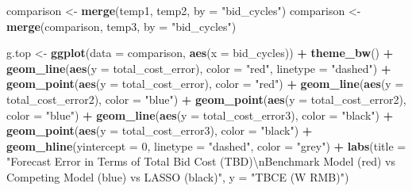 \documentclass[]{article}
\newenvironment{Shaded}{\begin{snugshade}}{\end{snugshade}}
\newcommand{\KeywordTok}[1]{\textcolor[rgb]{0.13,0.29,0.53}{\textbf{#1}}}
\newcommand{\DataTypeTok}[1]{\textcolor[rgb]{0.13,0.29,0.53}{#1}}
\newcommand{\DecValTok}[1]{\textcolor[rgb]{0.00,0.00,0.81}{#1}}
\newcommand{\CharTok}[1]{\textcolor[rgb]{0.31,0.60,0.02}{#1}}
\newcommand{\StringTok}[1]{\textcolor[rgb]{0.31,0.60,0.02}{#1}}
\newcommand{\OperatorTok}[1]{\textcolor[rgb]{0.81,0.36,0.00}{\textbf{#1}}}
\newcommand{\NormalTok}[1]{#1}
\begin{document}
\begin{Shaded}
\begin{Highlighting}[]
{\NormalTok{comparison <-}\StringTok{ }\KeywordTok{merge}\NormalTok{(temp1, temp2, }\DataTypeTok{by =} \StringTok{"bid_cycles"}\NormalTok{)}
\NormalTok{comparison <-}\StringTok{ }\KeywordTok{merge}\NormalTok{(comparison, temp3, }\DataTypeTok{by =} \StringTok{"bid_cycles"}\NormalTok{)}

\NormalTok{g.top <-}\StringTok{ }\KeywordTok{ggplot}\NormalTok{(}\DataTypeTok{data =}\NormalTok{ comparison, }\KeywordTok{aes}\NormalTok{(}\DataTypeTok{x =}\NormalTok{ bid_cycles)) }\OperatorTok{+}
\StringTok{  }\KeywordTok{theme_bw}\NormalTok{() }\OperatorTok{+}
\StringTok{  }\KeywordTok{geom_line}\NormalTok{(}\KeywordTok{aes}\NormalTok{(}\DataTypeTok{y =}\NormalTok{ total_cost_error), }\DataTypeTok{color =} \StringTok{"red"}\NormalTok{, }\DataTypeTok{linetype =} \StringTok{"dashed"}\NormalTok{) }\OperatorTok{+}
\StringTok{  }\KeywordTok{geom_point}\NormalTok{(}\KeywordTok{aes}\NormalTok{(}\DataTypeTok{y =}\NormalTok{ total_cost_error), }\DataTypeTok{color =} \StringTok{"red"}\NormalTok{) }\OperatorTok{+}
\StringTok{  }\KeywordTok{geom_line}\NormalTok{(}\KeywordTok{aes}\NormalTok{(}\DataTypeTok{y =}\NormalTok{ total_cost_error2), }\DataTypeTok{color =} \StringTok{"blue"}\NormalTok{) }\OperatorTok{+}
\StringTok{  }\KeywordTok{geom_point}\NormalTok{(}\KeywordTok{aes}\NormalTok{(}\DataTypeTok{y =}\NormalTok{ total_cost_error2), }\DataTypeTok{color =} \StringTok{"blue"}\NormalTok{) }\OperatorTok{+}
\StringTok{  }\KeywordTok{geom_line}\NormalTok{(}\KeywordTok{aes}\NormalTok{(}\DataTypeTok{y =}\NormalTok{ total_cost_error3), }\DataTypeTok{color =} \StringTok{"black"}\NormalTok{) }\OperatorTok{+}
\StringTok{  }\KeywordTok{geom_point}\NormalTok{(}\KeywordTok{aes}\NormalTok{(}\DataTypeTok{y =}\NormalTok{ total_cost_error3), }\DataTypeTok{color =} \StringTok{"black"}\NormalTok{) }\OperatorTok{+}
\StringTok{  }\KeywordTok{geom_hline}\NormalTok{(}\DataTypeTok{yintercept =} \DecValTok{0}\NormalTok{, }\DataTypeTok{linetype =} \StringTok{"dashed"}\NormalTok{, }\DataTypeTok{color =} \StringTok{"grey"}\NormalTok{) }\OperatorTok{+}
\StringTok{  }\KeywordTok{labs}\NormalTok{(}\DataTypeTok{title =} \StringTok{"Forecast Error in Terms of Total Bid Cost (TBD)}\CharTok{\textbackslash{}n}\StringTok{Benchmark Model (red) vs Competing Model (blue) vs LASSO (black)"}\NormalTok{, }\DataTypeTok{y =} \StringTok{"TBCE (W RMB)"}\NormalTok{)}

}
\end{Highlighting}
\end{Shaded}
\end{document}
